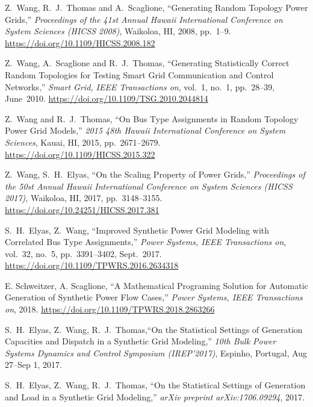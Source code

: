 \documentclass[12pt]{article}
\numberwithin{equation}{section}
\numberwithin{table}{section}
\numberwithin{figure}{section}
\begin{document}
\clearpage
\begin{thebibliography}{99}

Z.~Wang, R.~J.~Thomas and A.~Scaglione, ``Generating Random Topology Power Grids,'' \emph{Proceedings of the 41st Annual Hawaii International Conference on System Sciences (HICSS 2008)}, Waikoloa, HI, 2008, pp.~1--9.
\url{https://doi.org/10.1109/HICSS.2008.182}

Z.~Wang, A.~Scaglione and R.~J.~Thomas, ``Generating Statistically Correct Random Topologies for Testing Smart Grid Communication and Control Networks,'' \emph{Smart Grid, IEEE Transactions on}, vol.~1, no.~1, pp.~28--39, June~2010.
\url{https://doi.org/10.1109/TSG.2010.2044814}

Z.~Wang and R.~J.~Thomas, ``On Bus Type Assignments in Random Topology Power Grid Models,'' \emph{2015 48th Hawaii International Conference on System Sciences}, Kauai, HI, 2015, pp.~2671--2679.
\url{https://doi.org/10.1109/HICSS.2015.322}

Z.~Wang, S.~H.~Elyas, ``On the Scaling Property of Power Grids,'' \emph{Proceedings of the 50st Annual Hawaii International Conference on System Sciences (HICSS 2017)}, Waikoloa, HI, 2017, pp.~3148--3155.
\url{https://doi.org/10.24251/HICSS.2017.381}

S.~H.~Elyas, Z.~Wang, ``Improved Synthetic Power Grid Modeling with Correlated Bus Type Assignments,'' \emph{Power Systems, IEEE Transactions on}, vol.~32, no.~5, pp.~3391--3402, Sept.~2017.
\url{https://doi.org/10.1109/TPWRS.2016.2634318}

E. Schweitzer, A. Scaglione, ``A Mathematical Programing Solution for Automatic Generation of Synthetic Power Flow Cases,''  \emph{Power Systems, IEEE Transactions on}, 2018. \url{https://doi.org/10.1109/TPWRS.2018.2863266}

S.~H.~Elyas, Z.~Wang, R.~J.~Thomas,``On the Statistical Settings of Generation Capacities and Dispatch in a Synthetic Grid Modeling,'' \emph{10th Bulk Power Systems Dynamics and Control Symposium (IREP'2017)}, Espinho, Portugal, Aug 27--Sep 1, 2017.

S.~H.~Elyas, Z.~Wang, R.~J.~Thomas,
  ``On the Statistical Settings of Generation and Load in a Synthetic Grid Modeling,'' \emph{arXiv preprint arXiv:1706.09294}, 2017.


\end{thebibliography}
\end{document}
